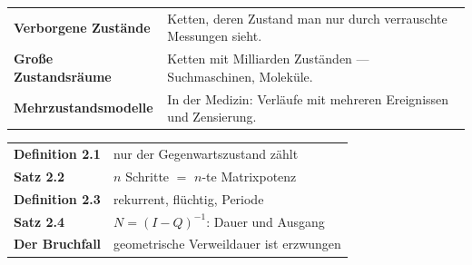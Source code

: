 \begin{forschung}
\begin{center}
{\small
\renewcommand{\arraystretch}{1.45}
\begin{tabular}{@{}P{3.4cm}P{4.8cm}@{}}
\toprule
\textbf{Verborgene Zustände} & Ketten, deren Zustand man nur durch verrauschte Messungen sieht.\\
\textbf{Große Zustandsräume} & Ketten mit Milliarden Zuständen --- Suchmaschinen, Moleküle.\\
\textbf{Mehrzustands\-modelle} & In der Medizin: Verläufe mit mehreren Ereignissen und Zensierung.\\
\bottomrule
\end{tabular}}
\end{center}

\begin{center}
\begin{minipage}{0.88\textwidth}
\end{minipage}
\end{center}
\end{forschung}

\begin{merksatz}
\begin{center}
\renewcommand{\arraystretch}{1.5}
\begin{tabular}{@{}P{3.0cm}P{5.6cm}@{}}
\toprule
\textbf{Definition 2.1} & nur der Gegenwartszustand zählt\\
\textbf{Satz 2.2} & $n$ Schritte $=$ $n$-te Matrixpotenz\\
\textbf{Definition 2.3} & rekurrent, flüchtig, Periode\\
\textbf{Satz 2.4} & $N = (I-Q)^{-1}$: Dauer und Ausgang\\
\textbf{Der Bruchfall} & geometrische Verweildauer ist erzwungen\\
\bottomrule
\end{tabular}
\end{center}

\begin{center}
\begin{minipage}{0.88\textwidth}
\end{minipage}
\end{center}
\end{merksatz}
